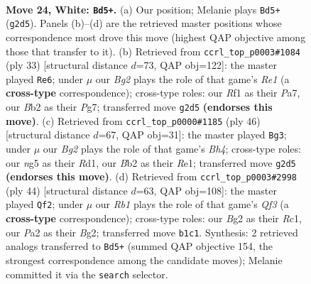 \documentclass[11pt]{article}
\begin{document}
\clearpage

\begin{figure}[p]\centering
\begin{subfigure}{0.46\textwidth}\centering
\resizebox{\linewidth}{!}{%
\newchessgame
\chessboard[
  setfen={r3qrk1/6b1/1pn5/p1p1Ppn1/2P4p/1P1N4/PB1P2B1/1R1Q1RK1 w - - 0 24},
  showmover=false,
  pgfstyle=straightmove, color=movearrow, markmove={g2-d5}
]}
\caption{}
\end{subfigure}\hfill
\begin{subfigure}{0.46\textwidth}\centering
\resizebox{\linewidth}{!}{%
\newchessgame
\chessboard[
  setfen={r2qr1k1/pp3pp1/3b1n1p/7b/3p4/3P2PP/PP1BNPB1/2RQR1K1 b - - 1 17},
  showmover=false,
  pgfstyle=straightmove, color=movearrow, markmove={e8-e6}
]}
\caption{}
\end{subfigure}
\\[4pt]
\begin{subfigure}{0.46\textwidth}\centering
\resizebox{\linewidth}{!}{%
\newchessgame
\chessboard[
  setfen={5rk1/pb2q3/1pn2r1p/2bp2p1/7B/P2BPN2/1PQ3PP/3RR2K w - - 0 24},
  showmover=false,
  pgfstyle=straightmove, color=movearrow, markmove={h4-g3}
]}
\caption{}
\end{subfigure}\hfill
\begin{subfigure}{0.46\textwidth}\centering
\resizebox{\linewidth}{!}{%
\newchessgame
\chessboard[
  setfen={2rr2k1/p2n1pbp/4p1p1/qp2P3/2nBNP2/5QP1/P5BP/2R2R1K w - - 5 23},
  showmover=false,
  pgfstyle=straightmove, color=movearrow, markmove={f3-f2}
]}
\caption{}
\end{subfigure}
\caption{\textbf{Move 24, White: \texttt{Bd5+}.} (a) Our position; Melanie plays \texttt{Bd5+} (\texttt{g2d5}). Panels (b)--(d) are the retrieved master positions whose correspondence most drove this move (highest QAP objective among those that transfer to it). (b) Retrieved from \texttt{ccrl\_top\_p0003\#1084} (ply 33) [structural distance $d$=73, QAP obj=122]: the master played \texttt{Re6}; under $\mu$ our \emph{Bg2} plays the role of that game's \emph{Re1} (a \textbf{cross-type} correspondence); cross-type roles: our \emph{R}f1 as their \emph{P}a7, our \emph{B}b2 as their \emph{P}g7; transferred move \texttt{g2d5} \textbf{(endorses this move)}. (c) Retrieved from \texttt{ccrl\_top\_p0000\#1185} (ply 46) [structural distance $d$=67, QAP obj=31]: the master played \texttt{Bg3}; under $\mu$ our \emph{Bg2} plays the role of that game's \emph{Bh4}; cross-type roles: our \emph{n}g5 as their \emph{R}d1, our \emph{B}b2 as their \emph{R}e1; transferred move \texttt{g2d5} \textbf{(endorses this move)}. (d) Retrieved from \texttt{ccrl\_top\_p0003\#2998} (ply 44) [structural distance $d$=63, QAP obj=108]: the master played \texttt{Qf2}; under $\mu$ our \emph{Rb1} plays the role of that game's \emph{Qf3} (a \textbf{cross-type} correspondence); cross-type roles: our \emph{B}g2 as their \emph{R}c1, our \emph{P}a2 as their \emph{B}g2; transferred move \texttt{b1c1}. Synthesis: 2 retrieved analogs transferred to \texttt{Bd5+} (summed QAP objective 154, the strongest correspondence among the candidate moves); Melanie committed it via the \texttt{search} selector.}
\label{fig:thought-m46}
\end{figure}
\end{document}
